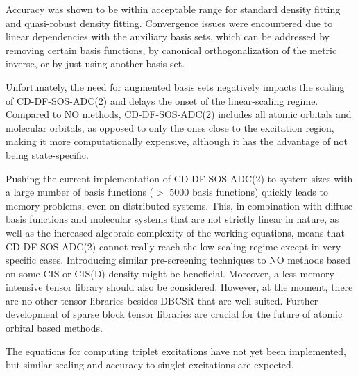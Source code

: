Accuracy was shown to be within acceptable range for standard density fitting and quasi-robust density fitting. Convergence issues were encountered due to linear dependencies with the auxiliary basis sets, which can be addressed by removing certain basis functions, by canonical orthogonalization of the metric inverse, or by just using another basis set. 

Unfortunately, the need for augmented basis sets negatively impacts the scaling of CD-DF-SOS-ADC(2) and delays the onset of the linear-scaling regime. Compared to NO methods, CD-DF-SOS-ADC(2) includes all atomic orbitals and molecular orbitals, as opposed to only the ones close to the excitation region, making it more computationally expensive, although it has the advantage of not being state-specific. 

Pushing the current implementation of CD-DF-SOS-ADC(2) to system sizes with a large number of basis functions ($>$ 5000 basis functions) quickly leads to memory problems, even on distributed systems. This, in combination with diffuse basis functions and molecular systems that are not strictly linear in nature, as well as the increased algebraic complexity of the working equations, means that CD-DF-SOS-ADC(2) cannot really reach the low-scaling regime except in very specific cases. Introducing similar pre-screening techniques to NO methods based on some CIS or CIS(D) density might be beneficial. Moreover, a less memory-intensive tensor library should also be considered. However, at the moment, there are no other tensor libraries besides DBCSR that are well suited. Further development of sparse block tensor libraries are crucial for the future of atomic orbital based methods.

The equations for computing triplet excitations have not yet been implemented, but similar scaling and accuracy to singlet excitations are expected. 